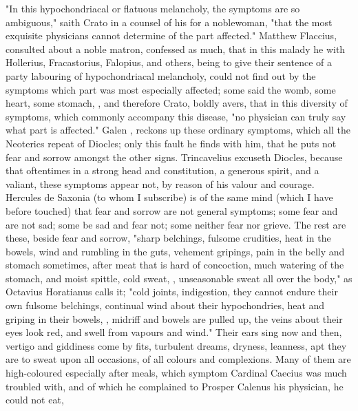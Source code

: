 {"In this hypochondriacal or flatuous melancholy, the symptoms are so
ambiguous," saith Crato in a counsel of his for a
noblewoman, "that the most exquisite physicians cannot determine of the part
affected." Matthew Flaccius, consulted about a noble matron, confessed as much,
that in this malady he with Hollerius, Fracastorius, Falopius, and others,
being to give their sentence of a party labouring of hypochondriacal
melancholy, could not find out by the symptoms which part was most especially
affected; some said the womb, some heart, some stomach, \etc{}, and therefore
Crato,  boldly avers, that in this
diversity of symptoms, which commonly accompany this disease,
"no physician can truly say what part is affected." Galen
, reckons up these ordinary
symptoms, which all the Neoterics repeat of Diocles; only this fault he finds
with him, that he puts not fear and sorrow amongst the other signs.
Trincavelius excuseth Diocles, 
because that oftentimes in a strong head and constitution, a generous spirit,
and a valiant, these symptoms appear not, by reason of his valour and courage.
Hercules de Saxonia (to whom I subscribe) is of the same
mind (which I have before touched) that fear and sorrow are not general
symptoms; some fear and are not sad; some be sad and fear not; some neither
fear nor grieve. The rest are these, beside fear and sorrow,
"sharp belchings, fulsome crudities, heat in the bowels,
wind and rumbling in the guts, vehement gripings, pain in the belly and stomach
sometimes, after meat that is hard of concoction, much watering of the stomach,
and moist spittle, cold sweat, , unseasonable sweat all
over the body," as Octavius Horatianus 
calls it; "cold joints, indigestion, they cannot endure
their own fulsome belchings, continual wind about their hypochondries, heat and
griping in their bowels, , midriff and
bowels are pulled up, the veins about their eyes look red, and swell from
vapours and wind." Their ears sing now and then, vertigo and giddiness come by
fits, turbulent dreams, dryness, leanness, apt they are to sweat upon all
occasions, of all colours and complexions. Many of them are high-coloured
especially after meals, which symptom Cardinal Caecius was much troubled with,
and of which he complained to Prosper Calenus his physician, he could not eat,
}
